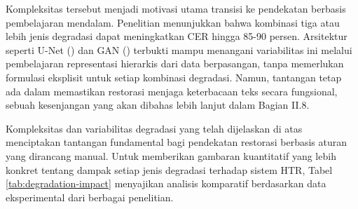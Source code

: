 \begin{enumerate}[leftmargin=*, labelindent=0pt, itemsep=1ex, topsep=0pt]
Kompleksitas tersebut menjadi motivasi utama transisi ke pendekatan berbasis pembelajaran mendalam. Penelitian \parencite{souibgui2022docentr} menunjukkan bahwa kombinasi tiga atau lebih jenis degradasi dapat meningkatkan CER hingga 85-90 persen. Arsitektur seperti U-Net (\parencite{ronneberger2015}) dan GAN (\parencite{goodfellow2014}) terbukti mampu menangani variabilitas ini melalui pembelajaran representasi hierarkis dari data berpasangan, tanpa memerlukan formulasi eksplisit untuk setiap kombinasi degradasi. Namun, tantangan tetap ada dalam memastikan restorasi menjaga keterbacaan teks secara fungsional, sebuah kesenjangan yang akan dibahas lebih lanjut dalam Bagian II.8.

\end{enumerate}

Kompleksitas dan variabilitas degradasi yang telah dijelaskan di atas menciptakan tantangan fundamental bagi pendekatan restorasi berbasis aturan yang dirancang manual. Untuk memberikan gambaran kuantitatif yang lebih konkret tentang dampak setiap jenis degradasi terhadap sistem HTR, Tabel \ref{tab:degradation-impact} menyajikan analisis komparatif berdasarkan data eksperimental dari berbagai penelitian.

